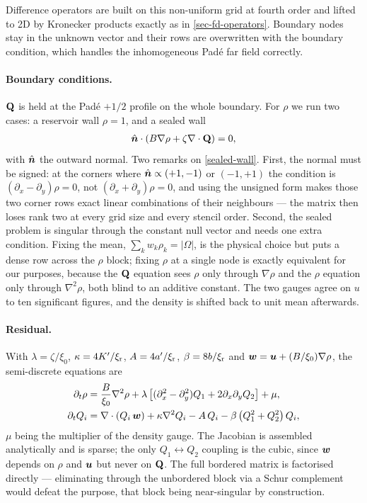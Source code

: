 \documentclass[a5paper]{article}
\begin{document}
Difference operators are built on this non-uniform grid at fourth order and lifted to 2D by Kronecker products exactly as in \cref{sec-fd-operators}. Boundary nodes stay in the unknown vector and their rows are overwritten with the boundary condition, which handles the inhomogeneous Pad\'e far field correctly.

\paragraph{Boundary conditions.} $\mathbf{Q}$ is held at the Pad\'e $+1/2$ profile on the whole boundary. For $\rho$ we run two cases: a reservoir wall $\rho = 1$, and a sealed wall
\begin{align}
    \label{sealed-wall}
    \hat{\boldsymbol{n}} \cdot \left( B \nabla \rho + \zeta \nabla\cdot\mathbf{Q} \right) = 0 ,
\end{align}
with $\hat{\boldsymbol{n}}$ the outward normal. Two remarks on \eqref{sealed-wall}. First, the normal must be signed: at the corners where $\hat{\boldsymbol{n}} \propto (+1,-1)$ or $(-1,+1)$ the condition is $(\partial_x - \partial_y)\rho = 0$, not $(\partial_x + \partial_y)\rho = 0$, and using the unsigned form makes those two corner rows exact linear combinations of their neighbours --- the matrix then loses rank two at every grid size and every stencil order. Second, the sealed problem is singular through the constant null vector and needs one extra condition. Fixing the mean, $\sum_k w_k \rho_k = |\Omega|$, is the physical choice but puts a dense row across the $\rho$ block; fixing $\rho$ at a single node is exactly equivalent for our purposes, because the $\mathbf{Q}$ equation sees $\rho$ only through $\nabla\rho$ and the $\rho$ equation only through $\nabla^2\rho$, both blind to an additive constant. The two gauges agree on $u$ to ten significant figures, and the density is shifted back to unit mean afterwards.

\paragraph{Residual.} With $\lambda = \zeta/\xi_0$, $\kappa = 4K'/\xi_{\rm r}$, $A = 4a'/\xi_{\rm r}$, $\beta = 8b/\xi_{\rm r}$ and $\boldsymbol{w} = \boldsymbol{u} + (B/\xi_0)\nabla\rho$, the semi-discrete equations are
\begin{align}
    \label{comoving-residual}
    \partial_t \rho &= \frac{B}{\xi_0}\nabla^2\rho + \lambda\left[(\partial_x^2 - \partial_y^2)Q_1 + 2\partial_x\partial_y Q_2\right] + \mu,
    \\
    \partial_t Q_i &= \nabla\cdot\left(Q_i\, \boldsymbol{w}\right) + \kappa \nabla^2 Q_i - A\,Q_i - \beta\left(Q_1^2 + Q_2^2\right)Q_i ,
\end{align}
$\mu$ being the multiplier of the density gauge. The Jacobian is assembled analytically and is sparse; the only $Q_1 \leftrightarrow Q_2$ coupling is the cubic, since $\boldsymbol w$ depends on $\rho$ and $\boldsymbol{u}$ but never on $\mathbf{Q}$. The full bordered matrix is factorised directly --- eliminating through the unbordered block via a Schur complement would defeat the purpose, that block being near-singular by construction.
\end{document}
